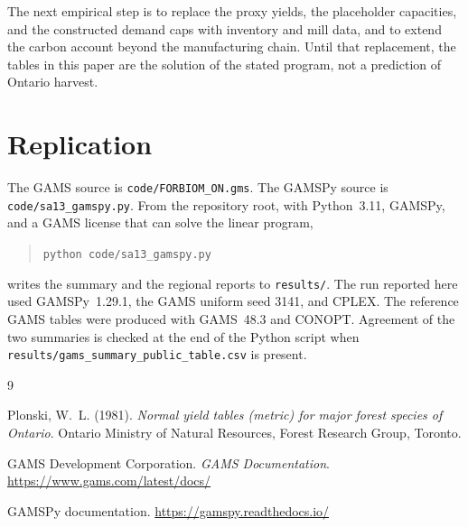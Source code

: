 \documentclass[11pt]{article}
\begin{document}
The next empirical step is to replace the proxy yields, the placeholder capacities, and the constructed demand caps with inventory and mill data, and to extend the carbon account beyond the manufacturing chain. Until that replacement, the tables in this paper are the solution of the stated program, not a prediction of Ontario harvest.

\section*{Replication}

The GAMS source is \texttt{code/FORBIOM\_ON.gms}. The GAMSPy source is \texttt{code/sa13\_gamspy.py}. From the repository root, with Python~3.11, GAMSPy, and a GAMS license that can solve the linear program,
\begin{quote}
\texttt{python code/sa13\_gamspy.py}
\end{quote}
writes the summary and the regional reports to \texttt{results/}. The run reported here used GAMSPy~1.29.1, the GAMS uniform seed 3141, and CPLEX. The reference GAMS tables were produced with GAMS~48.3 and CONOPT. Agreement of the two summaries is checked at the end of the Python script when \texttt{results/gams\_summary\_public\_table.csv} is present.

\begin{thebibliography}{9}

Plonski, W.~L. (1981).
\textit{Normal yield tables (metric) for major forest species of Ontario}.
Ontario Ministry of Natural Resources, Forest Research Group, Toronto.

GAMS Development Corporation.
\textit{GAMS Documentation}.
\url{https://www.gams.com/latest/docs/}

GAMSPy documentation.
\url{https://gamspy.readthedocs.io/}

\end{thebibliography}
\end{document}
